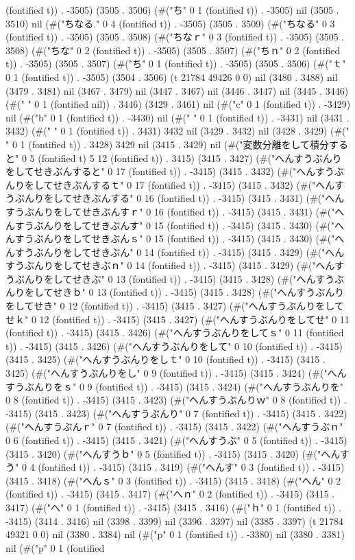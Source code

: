(fontified t)) . -3505) (3505 . 3506) (#("ち" 0 1 (fontified t)) . -3505) nil (3505 . 3510) nil (#("ちなる." 0 4 (fontified t)) . -3505) (3505 . 3509) (#("ちなる" 0 3 (fontified t)) . -3505) (3505 . 3508) (#("ちなｒ" 0 3 (fontified t)) . -3505) (3505 . 3508) (#("ちな" 0 2 (fontified t)) . -3505) (3505 . 3507) (#("ちｎ" 0 2 (fontified t)) . -3505) (3505 . 3507) (#("ち" 0 1 (fontified t)) . -3505) (3505 . 3506) (#("ｔ" 0 1 (fontified t)) . -3505) (3504 . 3506) (t 21784 49426 0 0) nil (3480 . 3488) nil (3479 . 3481) nil (3467 . 3479) nil (3447 . 3467) nil (3446 . 3447) nil (3445 . 3446) (#(" " 0 1 (fontified nil)) . 3446) (3429 . 3461) nil (#("c" 0 1 (fontified t)) . -3429) nil (#("b" 0 1 (fontified t)) . -3430) nil (#("
" 0 1 (fontified t)) . -3431) nil (3431 . 3432) (#(" " 0 1 (fontified t)) . 3431) 3432 nil (3429 . 3432) nil (3428 . 3429) (#(" " 0 1 (fontified t)) . 3428) 3429 nil (3415 . 3429) nil (#("変数分離をして積分すると" 0 5 (fontified t) 5 12 (fontified t)) . 3415) (3415 . 3427) (#("へんすうぶんりをしてせきぶんすると" 0 17 (fontified t)) . -3415) (3415 . 3432) (#("へんすうぶんりをしてせきぶんするｔ" 0 17 (fontified t)) . -3415) (3415 . 3432) (#("へんすうぶんりをしてせきぶんする" 0 16 (fontified t)) . -3415) (3415 . 3431) (#("へんすうぶんりをしてせきぶんすｒ" 0 16 (fontified t)) . -3415) (3415 . 3431) (#("へんすうぶんりをしてせきぶんす" 0 15 (fontified t)) . -3415) (3415 . 3430) (#("へんすうぶんりをしてせきぶんｓ" 0 15 (fontified t)) . -3415) (3415 . 3430) (#("へんすうぶんりをしてせきぶん" 0 14 (fontified t)) . -3415) (3415 . 3429) (#("へんすうぶんりをしてせきぶｎ" 0 14 (fontified t)) . -3415) (3415 . 3429) (#("へんすうぶんりをしてせきぶ" 0 13 (fontified t)) . -3415) (3415 . 3428) (#("へんすうぶんりをしてせきｂ" 0 13 (fontified t)) . -3415) (3415 . 3428) (#("へんすうぶんりをしてせき" 0 12 (fontified t)) . -3415) (3415 . 3427) (#("へんすうぶんりをしてせｋ" 0 12 (fontified t)) . -3415) (3415 . 3427) (#("へんすうぶんりをしてせ" 0 11 (fontified t)) . -3415) (3415 . 3426) (#("へんすうぶんりをしてｓ" 0 11 (fontified t)) . -3415) (3415 . 3426) (#("へんすうぶんりをして" 0 10 (fontified t)) . -3415) (3415 . 3425) (#("へんすうぶんりをしｔ" 0 10 (fontified t)) . -3415) (3415 . 3425) (#("へんすうぶんりをし" 0 9 (fontified t)) . -3415) (3415 . 3424) (#("へんすうぶんりをｓ" 0 9 (fontified t)) . -3415) (3415 . 3424) (#("へんすうぶんりを" 0 8 (fontified t)) . -3415) (3415 . 3423) (#("へんすうぶんりｗ" 0 8 (fontified t)) . -3415) (3415 . 3423) (#("へんすうぶんり" 0 7 (fontified t)) . -3415) (3415 . 3422) (#("へんすうぶんｒ" 0 7 (fontified t)) . -3415) (3415 . 3422) (#("へんすうぶｎ" 0 6 (fontified t)) . -3415) (3415 . 3421) (#("へんすうぶ" 0 5 (fontified t)) . -3415) (3415 . 3420) (#("へんすうｂ" 0 5 (fontified t)) . -3415) (3415 . 3420) (#("へんすう" 0 4 (fontified t)) . -3415) (3415 . 3419) (#("へんす" 0 3 (fontified t)) . -3415) (3415 . 3418) (#("へんｓ" 0 3 (fontified t)) . -3415) (3415 . 3418) (#("へん" 0 2 (fontified t)) . -3415) (3415 . 3417) (#("へｎ" 0 2 (fontified t)) . -3415) (3415 . 3417) (#("へ" 0 1 (fontified t)) . -3415) (3415 . 3416) (#("ｈ" 0 1 (fontified t)) . -3415) (3414 . 3416) nil (3398 . 3399) nil (3396 . 3397) nil (3385 . 3397) (t 21784 49321 0 0) nil (3380 . 3384) nil (#("p" 0 1 (fontified t)) . -3380) nil (3380 . 3381) nil (#("p" 0 1 (fontified 
